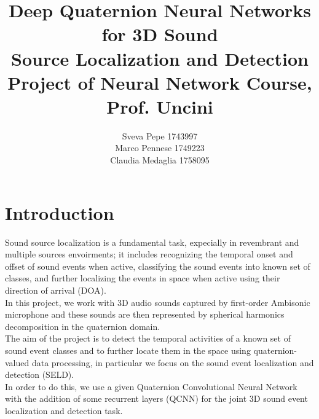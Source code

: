 \documentclass{article}
\title{Deep Quaternion Neural Networks for 3D Sound \\ Source Localization and Detection
\\ \large{\vspace{0.4cm}Project of Neural Network Course, Prof. Uncini}}
\author{Sveva Pepe 1743997 \\  Marco Pennese 1749223 \\  Claudia Medaglia 1758095}
\date{}
\begin{document}
    \maketitle
    \section{Introduction}
    Sound source localization is a fundamental task, expecially in revembrant and multiple sources envoirments; it includes recognizing the temporal onset and offset of sound events when active, classifying the sound events into known set of classes, and further localizing the events in space when active using their direction of arrival (DOA).\\
    In this project, we work with 3D audio sounds captured by first-order Ambisonic microphone and these sounds are then represented 
    by spherical harmonics decomposition in the quaternion domain.
    \\ The aim of the project is to detect the temporal activities of a known set of sound event classes and to further locate them in 
    the space using quaternion-valued data processing, in particular we focus on the sound event localization and detection (SELD). 
    \\ In order to do this, we use a given Quaternion Convolutional Neural Network with the addition of some recurrent layers (QCNN) 
    for the joint 3D sound event localization and detection task.
\end{document}
